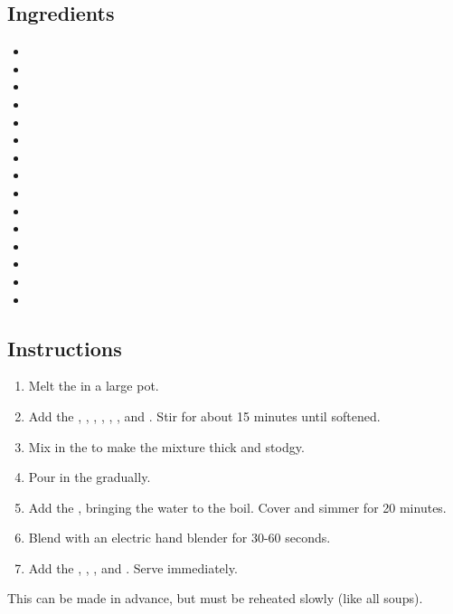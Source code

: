 \documentclass[12pt]{article}
\begin{document}
\recipetitle

\subsection*{Ingredients}

\begin{itemize}[nolistsep]
    \item {}
    \item {}
    \item {}
    \item {}
    \item {}
    \item {}
    \item {}
    \item {}
    \item {}
    \item {}
    \item {}
    \item {}
    \item {}
    \item {}
    \item {}
\end{itemize}

\subsection*{Instructions}

\begin{enumerate}
    \item Melt the  in a large pot.
    \item Add the , , , , , , and . Stir for about 15 minutes until softened.
    \item Mix in the  to make the mixture thick and stodgy.
    \item Pour in the  gradually.
    \item Add the , bringing the water to the boil. Cover and simmer for 20 minutes.
    \item Blend with an electric hand blender for 30-60 seconds.
    \item Add the , , , and . Serve immediately.
\end{enumerate}

This can be made in advance, but must be reheated slowly (like all soups).
\end{document}
